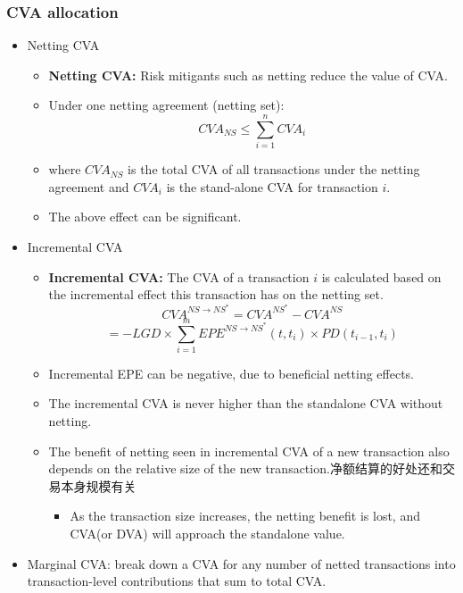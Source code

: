 \subsubsection{CVA allocation}
\begin{itemize}
    \item Netting CVA
\begin{itemize}
    \item \textbf{Netting CVA:} Risk mitigants such as netting reduce the value of CVA.
    \item Under one netting agreement (netting set):
    \[
    CVA_{NS} \leq \sum_{i=1}^{n} CVA_i
    \]
    \item where \( CVA_{NS} \) is the total CVA of all transactions under the netting agreement and \( CVA_i \) is the stand-alone CVA for transaction \( i \).
    \item The above effect can be significant.
\end{itemize}

\item Incremental CVA

\begin{itemize}
    \item \textbf{Incremental CVA:} The CVA of a transaction \( i \) is calculated based on the incremental effect this transaction has on the netting set.
    \[
    CVA^{NS \to NS^*} = CVA^{NS^*} - CVA^{NS}
    \]
    \[
    = -LGD \times \sum_{i=1}^{m} EPE^{NS \to NS^*}(t, t_i) \times PD(t_{i-1}, t_i)
    \]
    \item Incremental EPE can be negative, due to beneficial netting effects.
    \item The incremental CVA is never higher than the standalone CVA without netting.
    \item The benefit of netting seen in incremental CVA of a new transaction also depends on the relative size of the new transaction.净额结算的好处还和交易本身规模有关
    \begin{itemize}
        \item As the transaction size increases, the netting benefit is lost, and CVA(or DVA) will approach the standalone value.
    \end{itemize}
    
\end{itemize}

\item Marginal CVA: break down a CVA for any number of netted
transactions into transaction-level contributions that sum to
total CVA.


\end{itemize}
